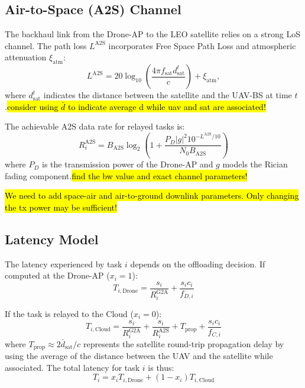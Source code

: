 \subsection{Air-to-Space (A2S) Channel}
The backhaul link from the Drone-AP to the LEO satellite relies on a strong LoS channel. The path loss $L^{\text{A2S}}$ incorporates Free Space Path Loss and atmospheric attenuation $\xi_{\text{atm}}$:
\begin{equation}
L^{\text{A2S}} = 20 \log_{10}\left(\frac{4\pi f_{\text{sat}} d^{t}_{\text{sat}}}{c}\right) + \xi_{\text{atm}},
\end{equation}
where $d^{t}_{\text{sat}}$ indicates the distance between the satellite and the UAV-BS at time $t$.\hl{consider using $\bar{d}$ to indicate average d while uav and sat are associated!}

The achievable A2S data rate for relayed tasks is:
\begin{equation}
R^{\text{A2S}}_i = B_{\text{A2S}} \log_2 \left( 1 + \frac{P_D |g|^2 10^{-L^{\text{A2S}}/10}}{N_0 B_{\text{A2S}}} \right)
\end{equation}
where $P_D$ is the transmission power of the Drone-AP and $g$ models the Rician fading component.\hl{find the bw value and exact channel parameters!}

\hl{We need to add space-air and air-to-ground downlink parameters. Only changing the tx power may be sufficient!}

\subsection{Latency Model}
The latency experienced by task $i$ depends on the offloading decision. If computed at the Drone-AP ($x_i = 1$):
\begin{equation}
T_{i, \text{Drone}} = \frac{s_i}{R^{\text{G2A}}_i} + \frac{s_i c_i}{f_{D,i}}
\end{equation}

If the task is relayed to the Cloud ($x_i = 0$):
\begin{equation}
T_{i, \text{Cloud}} = \frac{s_i}{R^{\text{G2A}}_i} + \frac{s_i}{R^{\text{A2S}}_i} + T_{\text{prop}} + \frac{s_i c_i}{f_{C,i}}
\end{equation}
where $T_{\text{prop}} \approx 2 \bar{d}_{\text{sat}} / c$ represents the satellite round-trip propagation delay by using the average of the distance between the UAV and the satellite while associated. The total latency for task $i$ is thus:
\begin{equation}
T_i = x_i T_{i, \text{Drone}} + (1 - x_i) T_{i, \text{Cloud}}
\end{equation}

